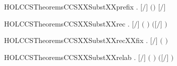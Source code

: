 \newcommand{\HOLCCSTheoremsCCSXXSubstXXpar}{\UseVerbatim{HOLCCSTheoremsCCSXXSubstXXpar}}
\begin{SaveVerbatim}{HOLCCSTheoremsCCSXXSubstXXprefix}
\HOLTokenTurnstile{} \HOLSymConst{\HOLTokenForall{}}   . \ensuremath{[}\ensuremath{/}\ensuremath{]} \ensuremath{(}\HOLSymConst{\ensuremath{\ldotp}}\ensuremath{)} \HOLSymConst{\ensuremath{=}} \HOLSymConst{\ensuremath{\ldotp}}\ensuremath{[}\ensuremath{/}\ensuremath{]} 
\end{SaveVerbatim}
\newcommand{\HOLCCSTheoremsCCSXXSubstXXprefix}{\UseVerbatim{HOLCCSTheoremsCCSXXSubstXXprefix}}
\begin{SaveVerbatim}{HOLCCSTheoremsCCSXXSubstXXrec}
\HOLTokenTurnstile{} \HOLSymConst{\HOLTokenForall{}}   .
       \ensuremath{[}\ensuremath{/}\ensuremath{]} \ensuremath{(}  \ensuremath{)} \HOLSymConst{\ensuremath{=}}
         \HOLSymConst{\ensuremath{=}}         \ensuremath{(}\ensuremath{[}\ensuremath{/}\ensuremath{]} \ensuremath{)}
\end{SaveVerbatim}
\newcommand{\HOLCCSTheoremsCCSXXSubstXXrec}{\UseVerbatim{HOLCCSTheoremsCCSXXSubstXXrec}}
\begin{SaveVerbatim}{HOLCCSTheoremsCCSXXSubstXXrecXXfix}
\HOLTokenTurnstile{} \HOLSymConst{\HOLTokenForall{}}  . \ensuremath{[}\ensuremath{/}\ensuremath{]} \ensuremath{(}  \ensuremath{)} \HOLSymConst{\ensuremath{=}}   
\end{SaveVerbatim}
\newcommand{\HOLCCSTheoremsCCSXXSubstXXrecXXfix}{\UseVerbatim{HOLCCSTheoremsCCSXXSubstXXrecXXfix}}
\begin{SaveVerbatim}{HOLCCSTheoremsCCSXXSubstXXrelab}
\HOLTokenTurnstile{} \HOLSymConst{\HOLTokenForall{}}   . \ensuremath{[}\ensuremath{/}\ensuremath{]} \ensuremath{(}  \ensuremath{)} \HOLSymConst{\ensuremath{=}}  \ensuremath{(}\ensuremath{[}\ensuremath{/}\ensuremath{]} \ensuremath{)} 
\end{SaveVerbatim}
